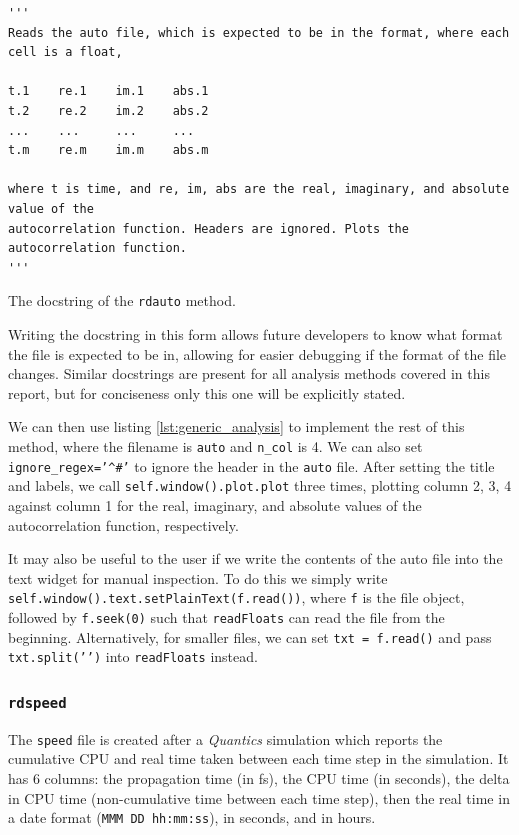 \documentclass[12pt]{article}
\newenvironment{code}{\captionsetup{type=listing}}{\par\addvspace{\baselineskip}}
\begin{document}
\begin{code}\begin{verbatim}
'''
Reads the auto file, which is expected to be in the format, where each cell is a float,

t.1    re.1    im.1    abs.1
t.2    re.2    im.2    abs.2
...    ...     ...     ...
t.m    re.m    im.m    abs.m

where t is time, and re, im, abs are the real, imaginary, and absolute value of the
autocorrelation function. Headers are ignored. Plots the autocorrelation function.
'''
\end{verbatim}
\caption{The docstring of the \texttt{rdauto} method.}
\label{lst:analysis_docstring}
\end{code}

Writing the docstring in this form allows future developers to know what format the file is expected to be in, allowing for easier debugging if the format of the file changes. Similar docstrings are present for all analysis methods covered in this report, but for conciseness only this one will be explicitly stated.

We can then use listing \ref{lst:generic_analysis} to implement the rest of this method, where the filename is \texttt{auto} and \texttt{n\_col} is 4. We can also set \texttt{ignore_regex='^#'} to ignore the header in the \texttt{auto} file. After setting the title and labels, we call \texttt{self.window().plot.plot} three times, plotting column 2, 3, 4 against column 1 for the real, imaginary, and absolute values of the autocorrelation function, respectively.

It may also be useful to the user if we write the contents of the auto file into the text widget for manual inspection. To do this we simply write \texttt{self.window().text.setPlainText(f.read())}, where \texttt{f} is the file object, followed by \texttt{f.seek(0)} such that \texttt{readFloats} can read the file from the beginning. Alternatively, for smaller files, we can set \texttt{txt = f.read()} and pass \texttt{txt.split('\n')} into \texttt{readFloats} instead.

\subsubsection{\texttt{rdspeed}}\label{sssec:rdspeed}

The \texttt{speed} file is created after a \textit{Quantics} simulation which reports the cumulative CPU and real time taken between each time step in the simulation. It has 6 columns: the propagation time (in fs), the CPU time (in seconds), the delta in CPU time (non-cumulative time between each time step), then the real time in a date format (\texttt{MMM DD hh:mm:ss}), in seconds, and in hours.
\end{document}
